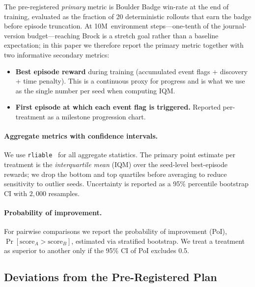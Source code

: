 The pre-registered \emph{primary} metric is Boulder Badge win-rate at
the end of training, evaluated as the fraction of 20 deterministic
rollouts that earn the badge before episode truncation.  At
10M~environment steps---one-tenth of the journal-version
budget---reaching Brock is a stretch goal rather than a baseline
expectation; in this paper we therefore report the primary metric
together with two informative secondary metrics:
%
\begin{itemize}
\item \textbf{Best episode reward} during training (accumulated event
  flags + discovery + time penalty).  This is a continuous proxy for
  progress and is what we use as the single number per seed when
  computing IQM.
\item \textbf{First episode at which each event flag is triggered.}
  Reported per-treatment as a milestone progression chart.
\end{itemize}

\paragraph{Aggregate metrics with confidence intervals.}
We use \texttt{rliable}~\citep{agarwal2021rliable} for all aggregate
statistics.  The primary point estimate per treatment is the
\emph{interquartile mean} (IQM) over the seed-level best-episode
rewards; we drop the bottom and top quartiles before averaging to
reduce sensitivity to outlier seeds.  Uncertainty is reported as a
95\% percentile bootstrap CI with $2{,}000$ resamples.

\paragraph{Probability of improvement.}
For pairwise comparisons we report the probability of improvement
(PoI), $\Pr[\text{score}_A > \text{score}_B]$, estimated via stratified
bootstrap.  We treat a treatment as superior to another only if the
95\% CI of PoI excludes 0.5.

\subsection{Deviations from the Pre-Registered Plan}
\label{sec:deviations}

